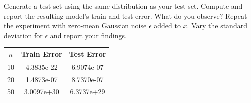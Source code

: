\documentclass[a4paper]{article}
\theoremstyle{definition}
\newenvironment{soln}{
    \leavevmode\color{blue}\ignorespaces
}{}
\begin{document}
Generate a test set using the same distribution as your test set. Compute and report the resulting model’s train and test error. What do you observe?
Repeat the experiment with zero-mean Gaussian noise $\epsilon$ added to $x$. Vary the standard deviation for $\epsilon$ and report your findings.

\begin{soln}
  \begin{center}
    \begin{tabular}{|c|c|c|}
      \hline
      $n$ & Train Error & Test Error \\
      \hline
      10  &  4.3835e-22  &  6.9074e-07  \\
      20  &  1.4873e-07  &  8.7370e-07  \\
      50  &  3.0097e+30  &  6.3737e+29  \\
      \hline
    \end{tabular}
  \end{center}
\end{soln}




\end{document}
